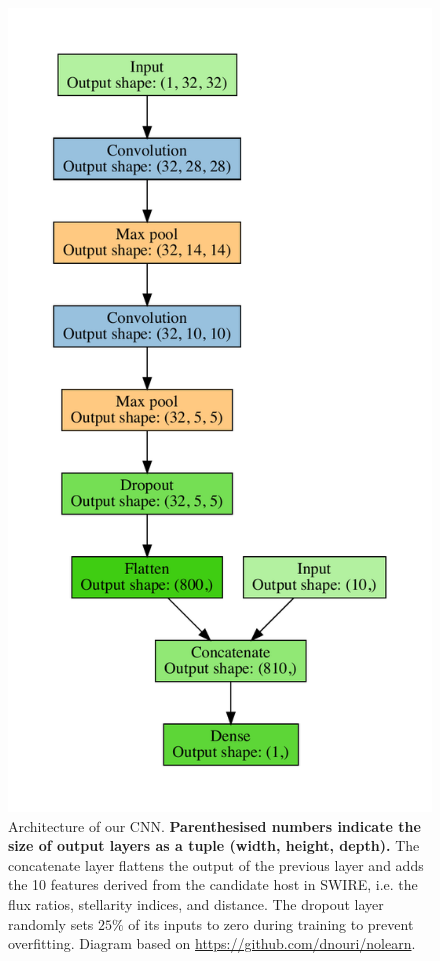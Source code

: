 \documentclass[fleqn,usenatbib,usedcolumn]{mnras}
\newcommand{\edited}[1]{{\bf {#1}}}
\begin{document}
    \begin{figure}
      \includegraphics[width=\linewidth]{images/cnn_model_graph}
      \caption{Architecture of our CNN. \edited{Parenthesised numbers indicate
      the size of output layers as a tuple (width, height, depth).} The
      concatenate layer flattens the output of the previous layer and adds the
      10 features derived from the candidate host in SWIRE, i.e. the flux
      ratios, stellarity indices, and distance. The dropout layer randomly
      sets $25\%$ of its inputs to zero during training to prevent
      overfitting. Diagram based on \url{ https://github.com/dnouri/nolearn}.}
      \label{fig:cnn}
    \end{figure}
\end{document}
